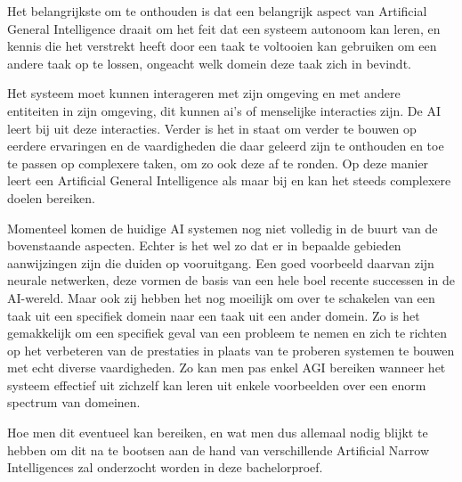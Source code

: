 Het belangrijkste om te onthouden is dat een belangrijk aspect van Artificial General Intelligence draait om het feit dat een systeem autonoom kan leren, en kennis die het verstrekt heeft door een taak te voltooien kan gebruiken om een andere taak op te lossen, ongeacht welk domein deze taak zich in bevindt. 

Het systeem moet kunnen interageren met zijn omgeving en met andere entiteiten in zijn omgeving, dit kunnen ai's of menselijke interacties zijn. De AI leert bij uit deze interacties. Verder is het in staat om verder te bouwen op eerdere ervaringen en de vaardigheden die daar geleerd zijn te onthouden en toe te passen op complexere taken, om zo ook deze af te ronden. Op deze manier leert een Artificial General Intelligence als maar bij en kan het steeds complexere doelen bereiken.

\autocite{goertzel2007artificial}

Momenteel komen de huidige AI systemen nog niet volledig in de buurt van de bovenstaande aspecten. Echter is het wel zo dat er in bepaalde gebieden aanwijzingen zijn die duiden op vooruitgang. Een goed voorbeeld daarvan zijn neurale netwerken, deze vormen de basis van een hele boel recente successen in de AI-wereld. Maar ook zij hebben het nog moeilijk om over te schakelen van een taak uit een specifiek domein naar een taak uit een ander domein. Zo is het gemakkelijk om een specifiek geval van een probleem te nemen en zich te richten op het verbeteren van de prestaties in plaats van te proberen systemen te bouwen met echt diverse vaardigheden. Zo kan men pas enkel AGI bereiken wanneer het systeem effectief uit zichzelf kan leren uit enkele voorbeelden over een enorm spectrum van domeinen.

Hoe men dit eventueel kan bereiken, en wat men dus allemaal nodig blijkt te hebben om dit na te bootsen aan de hand van verschillende Artificial Narrow Intelligences zal onderzocht worden in deze bachelorproef.

\autocite{shevlin2019limits}

\newpage


